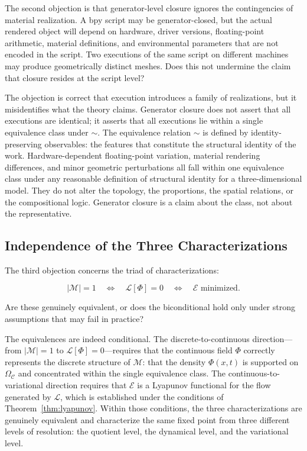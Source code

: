 \documentclass[11pt, twoside]{article}
\theoremstyle{plain}
\theoremstyle{definition}
\theoremstyle{remark}
\newcommand{\OmC}{\Omega_{\mathcal{C}}}
\begin{document}
The second objection is that generator-level closure ignores the contingencies of material realization. A bpy script may be generator-closed, but the actual rendered object will depend on hardware, driver versions, floating-point arithmetic, material definitions, and environmental parameters that are not encoded in the script. Two executions of the same script on different machines may produce geometrically distinct meshes. Does this not undermine the claim that closure resides at the script level?

The objection is correct that execution introduces a family of realizations, but it misidentifies what the theory claims. Generator closure does not assert that all executions are identical; it asserts that all executions lie within a single equivalence class under $\sim$. The equivalence relation $\sim$ is defined by identity-preserving observables: the features that constitute the structural identity of the work. Hardware-dependent floating-point variation, material rendering differences, and minor geometric perturbations all fall within one equivalence class under any reasonable definition of structural identity for a three-dimensional model. They do not alter the topology, the proportions, the spatial relations, or the compositional logic. Generator closure is a claim about the class, not about the representative.

\subsection{Independence of the Three Characterizations}

The third objection concerns the triad of characterizations:

\[
|\mathcal{M}| = 1 \quad \Longleftrightarrow \quad \mathcal{L}[\Phi] = 0 \quad \Longleftrightarrow \quad \mathcal{E} \text{ minimized}.
\]

Are these genuinely equivalent, or does the biconditional hold only under strong assumptions that may fail in practice?

The equivalences are indeed conditional. The discrete-to-continuous direction---from $|\mathcal{M}| = 1$ to $\mathcal{L}[\Phi] = 0$---requires that the continuous field $\Phi$ correctly represents the discrete structure of $\mathcal{M}$: that the density $\Phi(x,t)$ is supported on $\OmC$ and concentrated within the single equivalence class. The continuous-to-variational direction requires that $\mathcal{E}$ is a Lyapunov functional for the flow generated by $\mathcal{L}$, which is established under the conditions of Theorem~\ref{thm:lyapunov}. Within those conditions, the three characterizations are genuinely equivalent and characterize the same fixed point from three different levels of resolution: the quotient level, the dynamical level, and the variational level.
\end{document}
